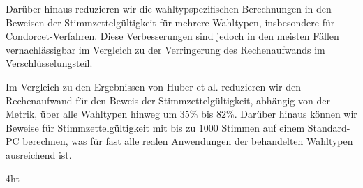 \documentclass[
  a4paper,  %
  twoside,  %
  bibliography=totoc,
  headsepline,
  cleardoublepage=empty,
  parskip=half,
  draft=false
]{scrbook}
\begin{document}
Darüber hinaus reduzieren wir die wahltypspezifischen Berechnungen in den Beweisen der Stimmzettelgültigkeit für mehrere Wahltypen, insbesondere für Condorcet-Verfahren.
Diese Verbesserungen sind jedoch in den meisten Fällen vernachlässigbar im Vergleich zu der Verringerung des Rechenaufwands im Verschlüsselungsteil.

Im Vergleich zu den Ergebnissen von Huber et al. reduzieren wir den Rechenaufwand für den Beweis der Stimmzettelgültigkeit, abhängig von der Metrik, über alle Wahltypen hinweg um $35\%$ bis $82\%$.
Darüber hinaus können wir Beweise für Stimmzettelgültigkeit mit bis zu $1000$ Stimmen auf einem Standard-PC berechnen, was für fast alle realen Anwendungen der behandelten Wahltypen ausreichend ist.

\cleardoublepage



\iftex4ht
\else
\fi

%
%

%
%
%
\tableofcontents




\end{document}
